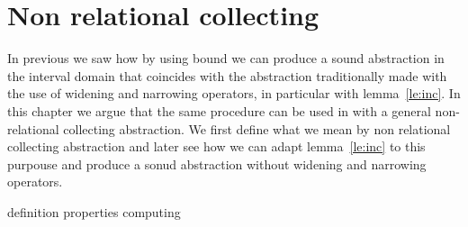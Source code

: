 \section{Non relational collecting}
\label{sec:nonrelational}

In previous we saw how by using bound we can produce a sound
abstraction in the interval domain that coincides with the abstraction
traditionally made with the use of widening and narrowing operators,
in particular with lemma~\ref{le:inc}. In this chapter we argue that
the same procedure can be used in with a general non-relational
collecting abstraction. We first define what we mean by non relational
collecting abstraction and later see how we can adapt
lemma~\ref{le:inc} to this purpouse and produce a sonud abstraction
without widening and narrowing operators.

{definition}
{properties}
{computing}
